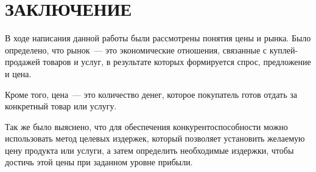\chapter*{\hfill{\centering  ЗАКЛЮЧЕНИЕ}\hfill}

В ходе написания данной работы были рассмотрены понятия цены и рынка. 
Было определено, что рынок~--- это экономические отношения, связанные с куплей-продажей товаров и услуг, в результате которых формируется спрос, предложение и цена.

Кроме того, цена~--- это количество денег, которое покупатель готов отдать за конкретный товар или услугу.

Так же было выяснено, что для обеспечения конкурентоспособности можно использовать метод целевых издержек, который позволяет установить желаемую цену продукта или услуги, а затем определить необходимые издержки, чтобы достичь этой цены при заданном уровне прибыли.